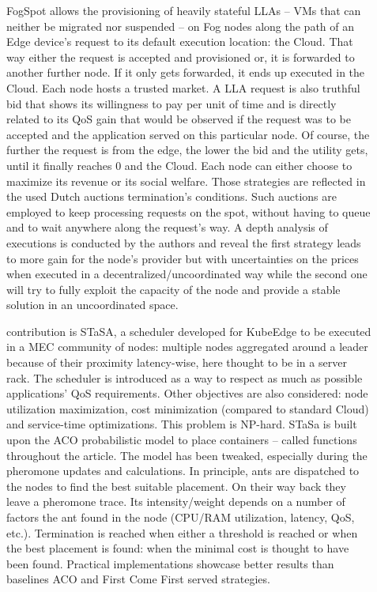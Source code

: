 \documentclass[11pt]{sdm}
\begin{document}
\begin{description}
	\item[] FogSpot allows the provisioning of heavily stateful \glspl{LLA} -- \glspl{VM} that can neither be migrated nor suspended -- on Fog nodes along the path of an Edge device's request to its default execution location: the Cloud. That way either the request is accepted and provisioned or, it is forwarded to another further node. If it only gets forwarded, it ends up executed in the Cloud.
		Each node hosts a trusted market. A \gls{LLA} request is also truthful bid that shows its willingness to pay per unit of time and is directly related to its \gls{QoS} gain that would be observed if the request was to be accepted and the application served on this particular node. Of course, the further the request is from the edge, the lower the bid and the utility gets, until it finally reaches 0 and the Cloud.
		Each node can either choose to maximize its revenue or its social welfare. Those strategies are reflected in the used Dutch auctions termination's conditions. Such auctions are employed to keep processing requests on the spot, without having to queue and to wait anywhere along the request's way. A depth analysis of executions is conducted by the authors and reveal the first strategy leads to more gain for the node's provider but with uncertainties on the prices when executed in a decentralized/uncoordinated way while the second one will try to fully exploit the capacity of the node and provide a stable solution in an uncoordinated space.

	\item[] contribution is STaSA, a scheduler developed for KubeEdge to be executed in a \gls{MEC} community of nodes: multiple nodes aggregated around a leader because of their proximity latency-wise, here thought to be in a server rack. The scheduler is introduced as a way to respect as much as possible applications' \gls{QoS} requirements. Other objectives are also considered: node utilization maximization, cost minimization (compared to standard Cloud) and service-time optimizations. This problem is NP-hard. STaSa is built upon the \gls{ACO} probabilistic model to place containers -- called functions throughout the article. The model has been tweaked, especially during the pheromone updates and calculations. In principle, ants are dispatched to the nodes to find the best suitable placement. On their way back they leave a pheromone trace. Its intensity/weight depends on a number of factors the ant found in the node (CPU/RAM utilization, latency, QoS, etc.). Termination is reached when either a threshold is reached or when the best placement is found: when the minimal cost is thought to have been found. Practical implementations showcase better results than baselines \gls{ACO} and First Come First served strategies.


\end{description}
\end{document}
